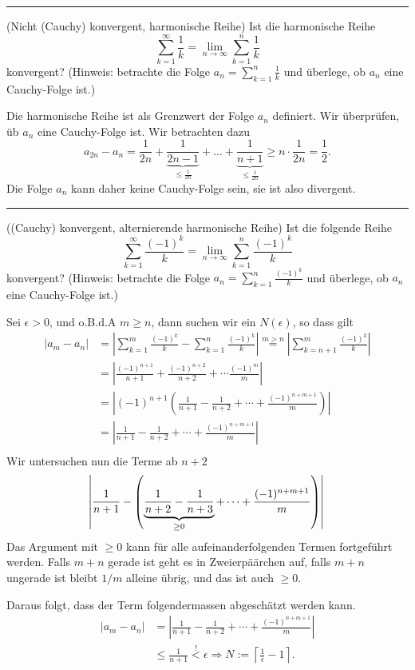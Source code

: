 \documentclass[a4paper,landscape,8pt]{extarticle}
\newcommand{\abs}[1]{\left\lvert #1 \right\rvert}
\newcommand{\ceil}[1]{\left\lceil #1 \right\rceil}
\newcommand{\sep}{\vspace{5pt}\noindent\hrule\vspace{5pt}}
\begin{document}
\begin{multicols*}{4}
\begin{warmup}
\sep

\Bsp (Nicht (Cauchy) konvergent, harmonische Reihe) Ist die harmonische Reihe
\[
\sum_{k=1}^\infty \frac{1}{k} = \lim_{n\to\infty} \sum_{k=1}^n\frac{1}{k}
\]
konvergent? (Hinweis: betrachte die Folge $a_n = \sum_{k=1}^n\frac{1}{k}$ und
überlege, ob $a_n$ eine Cauchy-Folge ist.)

Die harmonische Reihe ist als Grenzwert der Folge $a_n$ definiert. Wir
überprüfen, üb $a_n$ eine Cauchy-Folge ist. Wir betrachten dazu
\[
a_{2n} - a_n = \frac{1}{2n} + \underbrace{\frac{1}{2n-1}}_{\leq \frac{1}{2n}} +
\ldots +
\underbrace{\frac{1}{n+1}}_{\leq \frac{1}{2n}} \geq n\cdot\frac{1}{2n} =
\frac{1}{2}.
\]
Die Folge $a_n$ kann daher keine Cauchy-Folge sein, sie ist also divergent.

\sep

\Bsp ((Cauchy) konvergent, alternierende harmonische Reihe)
Ist die folgende Reihe
\[
\sum_{k=1}^{\infty} \frac{(-1)^k}{k}
= \lim_{n\to\infty} \sum_{k=1}^{n} \frac{(-1)^k}{k}
\]
konvergent? (Hinweis: betrachte die Folge $a_n=\sum_{k=1}^{n} \frac{(-1)^k}{k}$
und überlege, ob $a_n$ eine Cauchy-Folge ist.)

Sei $\epsilon > 0$, und o.B.d.A $m\geq n$, dann suchen wir ein $N(\epsilon)$, so
dass gilt
\begin{align*}
\abs{a_m - a_n}
&= \abs{ \sum_{k=1}^{m} \frac{(-1)^k}{k} - 
 \sum_{k=1}^{n} \frac{(-1)^k}{k}}
 \stackrel{m>n}{=} \abs{ \sum_{k=n+1}^{m} \frac{(-1)^k}{k} }\\
&= \abs{ \frac{(-1)^{n+1}}{n+1} + \frac{(-1)^{n+2}}{n+2} + \cdots
\frac{(-1)^{m}}{m}}\\
&= \abs{(-1)^{n+1}\left(\frac{1}{n+1}-\frac{1}{n+2}+\cdots
+\frac{(-1)^{n+m+1}}{m}\right)}\\
&= \abs{\frac{1}{n+1}-\frac{1}{n+2}+\cdots
+\frac{(-1)^{n+m+1}}{m}}\\
\end{align*}
Wir untersuchen nun die Terme ab $n+2$
\[
\abs{\frac{1}{n+1}-\left(\underbrace{\frac{1}{n+2}-\frac{1}{n+3}}_{\geq
0}+\cdots +\frac{(-1)^{n+m+1}}{m}\right)}\\
\]
Das Argument mit $\geq 0$ kann für alle aufeinanderfolgenden Termen fortgeführt
werden. Falls $m+n$ gerade ist geht es in Zweierpäärchen auf, falls $m+n$
ungerade ist bleibt $1/m$ alleine übrig, und das ist auch $\geq 0$.

Daraus folgt, dass der Term folgendermassen abgeschätzt werden kann.
\begin{align*}
\abs{a_m - a_n}
&= \abs{\frac{1}{n+1}-\frac{1}{n+2}+\cdots+\frac{(-1)^{n+m+1}}{m}}\\
&\leq \frac{1}{n+1} \stackrel{!}{<} \epsilon \Longrightarrow N :=
\ceil{\frac{1}{\epsilon}-1}.
\end{align*}


\end{warmup}
\end{multicols*}
\end{document}
